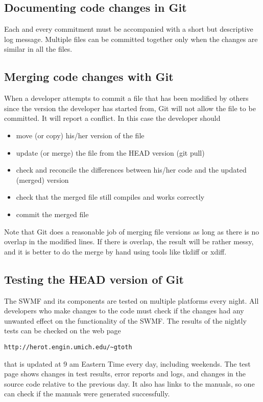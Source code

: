 \documentclass{article}
\begin{document}
\subsection{Documenting code changes in Git}

Each and every commitment must be accompanied with a short but descriptive 
log message. Multiple files can be committed together only when the changes
are similar in all the files.

\subsection{Merging code changes with Git}

When a developer attempts to commit a file that has been modified by others
since the version the developer has started from, Git will not allow the file
to be committed. It will report a conflict. In this case the developer should 
\begin{itemize}
\item move (or copy) his/her version of the file
\item update (or merge) the file from the HEAD version (git pull)
\item check and reconcile the differences between his/her code and 
      the updated (merged) version
\item check that the merged file still compiles and works correctly
\item commit the merged file
\end{itemize}
Note that Git does a reasonable job of merging file versions as long as there
is no overlap in the modified lines. If there is overlap, the result will be
rather messy, and it is better to do the merge by hand using tools like 
tkdiff or xdiff.

\subsection{Testing the HEAD version of Git}


The SWMF and its components are tested on multiple platforms every night.
All developers who make changes to the code must check if the changes had
any unwanted effect on the functionality of the SWMF. The results of the
nightly tests can be checked on the web page
\begin{verbatim}
http://herot.engin.umich.edu/~gtoth
\end{verbatim}
that is updated at 9 am Eastern Time every day, including weekends. The
test page shows changes in test results, error reports and logs, and 
changes in the source code relative to the previous day. It also has links
to the manuals, so one can check if the manuals were generated successfully.
\end{document}

